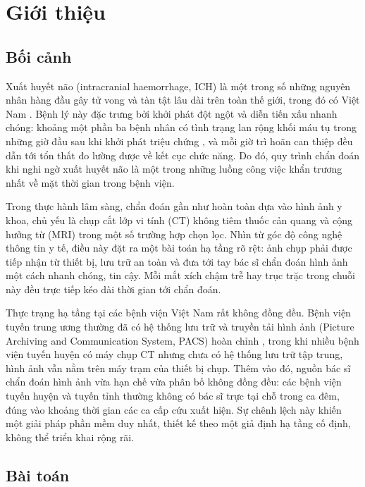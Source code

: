 \section{Giới thiệu}

\subsection{Bối cảnh}

Xuất huyết não (intracranial haemorrhage, ICH) là một trong số những nguyên nhân
hàng đầu gây tử vong và tàn tật lâu dài trên toàn thế giới, trong đó có Việt Nam \cite{feigin2022burden}. Bệnh lý này đặc trưng bởi khởi phát đột ngột và diễn tiến xấu nhanh chóng: khoảng
một phần ba bệnh nhân có tình trạng lan rộng khối máu tụ trong những giờ đầu
sau khi khởi phát triệu chứng \cite{dowlatshahi2011expansion}, và mỗi giờ trì hoãn can thiệp đều dẫn tới tổn
thất đo lường được về kết cục chức năng. Do đó, quy trình chẩn đoán khi nghi
ngờ xuất huyết não là một trong những luồng công việc khẩn trương nhất về mặt
thời gian trong bệnh viện.

Trong thực hành lâm sàng, chẩn đoán gần như hoàn toàn dựa vào hình ảnh y khoa,
chủ yếu là chụp cắt lớp vi tính (CT) không tiêm thuốc cản quang và cộng hưởng từ (MRI) trong một số trường hợp chọn lọc. Nhìn từ góc độ công nghệ thông tin
y tế, điều này đặt ra một bài toán hạ tầng rõ rệt: ảnh chụp phải được tiếp nhận
từ thiết bị, lưu trữ an toàn và đưa tới tay bác sĩ chẩn đoán hình ảnh một cách
nhanh chóng, tin cậy. Mỗi mắt xích chậm trễ hay trục trặc trong chuỗi này đều
trực tiếp kéo dài thời gian tới chẩn đoán.

Thực trạng hạ tầng tại các bệnh viện Việt Nam rất không đồng đều. Bệnh viện
tuyến trung ương thường đã có hệ thống lưu trữ và truyền tải hình ảnh (Picture
Archiving and Communication System, PACS) hoàn chỉnh \cite{huang2011pacs}, trong khi nhiều bệnh viện
tuyến huyện có máy chụp CT nhưng chưa có hệ thống lưu trữ tập trung, hình ảnh
vẫn nằm trên máy trạm của thiết bị chụp. Thêm vào đó, nguồn bác sĩ chẩn đoán
hình ảnh vừa hạn chế vừa phân bố không đồng đều: các bệnh viện tuyến huyện và
tuyến tỉnh thường không có bác sĩ trực tại chỗ trong ca đêm, đúng vào khoảng
thời gian các ca cấp cứu xuất hiện. Sự chênh lệch này khiến một giải pháp phần
mềm duy nhất, thiết kế theo một giả định hạ tầng cố định, không thể triển khai
rộng rãi.

\subsection{Bài toán}

